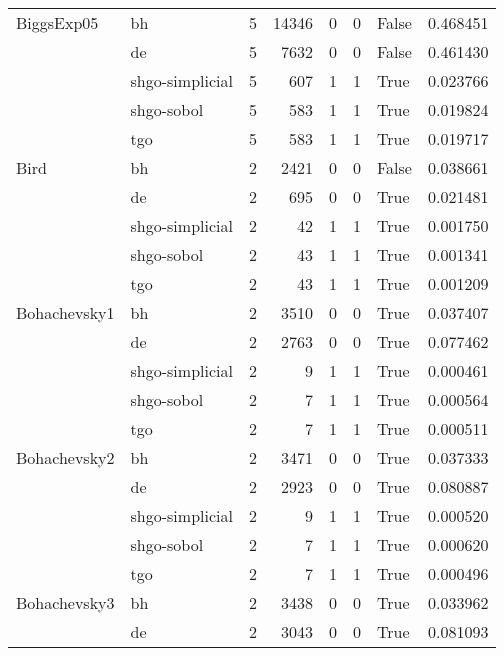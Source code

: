 \begin{longtable}{llrrrrlr}
BiggsExp05 & bh &     5 &    14346 &      0 &       0 &   False &    0.468451 \\
         & de &     5 &     7632 &      0 &       0 &   False &    0.461430 \\
         & shgo-simplicial &     5 &      607 &      1 &       1 &    True &    0.023766 \\
         & shgo-sobol &     5 &      583 &      1 &       1 &    True &    0.019824 \\
         & tgo &     5 &      583 &      1 &       1 &    True &    0.019717 \\
Bird & bh &     2 &     2421 &      0 &       0 &   False &    0.038661 \\
         & de &     2 &      695 &      0 &       0 &    True &    0.021481 \\
         & shgo-simplicial &     2 &       42 &      1 &       1 &    True &    0.001750 \\
         & shgo-sobol &     2 &       43 &      1 &       1 &    True &    0.001341 \\
         & tgo &     2 &       43 &      1 &       1 &    True &    0.001209 \\
Bohachevsky1 & bh &     2 &     3510 &      0 &       0 &    True &    0.037407 \\
         & de &     2 &     2763 &      0 &       0 &    True &    0.077462 \\
         & shgo-simplicial &     2 &        9 &      1 &       1 &    True &    0.000461 \\
         & shgo-sobol &     2 &        7 &      1 &       1 &    True &    0.000564 \\
         & tgo &     2 &        7 &      1 &       1 &    True &    0.000511 \\
Bohachevsky2 & bh &     2 &     3471 &      0 &       0 &    True &    0.037333 \\
         & de &     2 &     2923 &      0 &       0 &    True &    0.080887 \\
         & shgo-simplicial &     2 &        9 &      1 &       1 &    True &    0.000520 \\
         & shgo-sobol &     2 &        7 &      1 &       1 &    True &    0.000620 \\
         & tgo &     2 &        7 &      1 &       1 &    True &    0.000496 \\
Bohachevsky3 & bh &     2 &     3438 &      0 &       0 &    True &    0.033962 \\
         & de &     2 &     3043 &      0 &       0 &    True &    0.081093 \\

\end{longtable}

